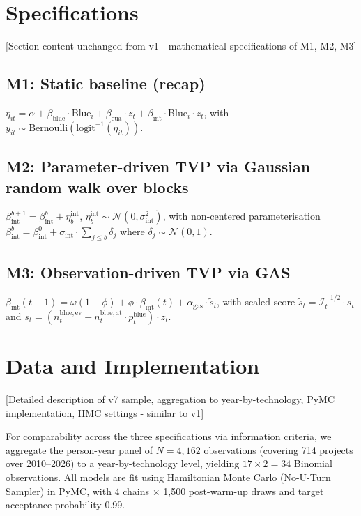 \documentclass[11pt,a4paper]{article}
\newcommand{\bint}{\beta_{\mathrm{int}}}
\newcommand{\bblue}{\beta_{\mathrm{blue}}}
\newcommand{\beua}{\beta_{\mathrm{eua}}}
\begin{document}
\section{Specifications}
\label{sec:ch7-spec}

[Section content unchanged from v1 - mathematical specifications of M1, M2, M3]

\subsection*{M1: Static baseline (recap)}
$\eta_{it} = \alpha + \bblue \cdot \mathrm{Blue}_i + \beua \cdot z_t + \bint \cdot \mathrm{Blue}_i \cdot z_t$,
with $y_{it} \sim \mathrm{Bernoulli}(\mathrm{logit}^{-1}(\eta_{it}))$.

\subsection*{M2: Parameter-driven TVP via Gaussian random walk over blocks}
$\bint^{b+1} = \bint^b + \eta_b^{\mathrm{int}}$, $\eta_b^{\mathrm{int}} \sim \mathcal{N}(0, \sigma^2_{\mathrm{int}})$, with non-centered parameterisation $\bint^b = \bint^0 + \sigma_{\mathrm{int}} \cdot \sum_{j \leq b} \delta_j$ where $\delta_j \sim \mathcal{N}(0,1)$.

\subsection*{M3: Observation-driven TVP via GAS}
$\bint(t+1) = \omega(1-\phi) + \phi \cdot \bint(t) + \alpha_{\mathrm{gas}} \cdot \tilde{s}_t$,
with scaled score $\tilde{s}_t = \mathcal{I}_t^{-1/2} \cdot s_t$ and $s_t = (n_t^{\mathrm{blue, ev}} - n_t^{\mathrm{blue, at}} \cdot p_t^{\mathrm{blue}}) \cdot z_t$.

\section{Data and Implementation}
\label{sec:ch7-data}

[Detailed description of v7 sample, aggregation to year-by-technology, PyMC implementation, HMC settings - similar to v1]

For comparability across the three specifications via information criteria, we aggregate the person-year panel of $N = 4{,}162$ observations (covering 714 projects over 2010--2026) to a year-by-technology level, yielding $17 \times 2 = 34$ Binomial observations. All models are fit using Hamiltonian Monte Carlo (No-U-Turn Sampler) in PyMC, with 4 chains $\times$ 1{,}500 post-warm-up draws and target acceptance probability 0.99.
\end{document}
